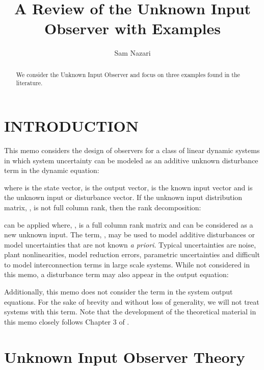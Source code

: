 \documentclass{amsart}
\theoremstyle{definition}
\theoremstyle{remark}
\numberwithin{equation}{section}
\begin{document}
\title{A Review of the Unknown Input Observer with Examples}

\author{Sam Nazari}
\address{Department of Electrical \& Computer Engineering, Northeastern University, Boston, MA,02210}










\begin{abstract}
We consider the Unknown Input Observer and focus on three examples found in the literature.
\end{abstract}

\maketitle
\section{INTRODUCTION}
\label{sec:intro}  

This memo considers the design of observers for a class of linear dynamic systems in which system uncertainty can be modeled as an additive unknown disturbance term in the dynamic equation: 




\noindent where  is the state vector,  is the output vector,  is the known input vector and  is the unknown input or disturbance vector. If the unknown input distribution matrix, , is not full column rank, then the rank decomposition: 



can be applied where, , is a full column rank matrix and  can be considered as a new unknown input. The term, , may be used to model additive disturbances or model uncertainties that are not known \textit{a priori}. Typical uncertainties are noise, plant nonlinearities, model reduction errors, parametric uncertainties and difficult to model interconnection terms in large scale systems. While not considered in this memo, a disturbance term may also appear in the output equation:

Additionally, this memo does not consider the  term in the system output equations.  For the sake of brevity and without loss of generality, we will not treat systems with this term. Note that the development of the theoretical material in this memo closely follows Chapter 3 of \cite{Chen99}. 
\section{Unknown Input Observer Theory} 
\end{document}

